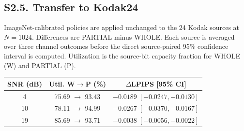 \clearpage\subsection*{S2.5. Transfer to Kodak24}
\label{sec:kodak_transfer}
ImageNet-calibrated policies are applied unchanged to the 24 Kodak sources at $N=1024$. Differences are PARTIAL minus WHOLE. Each source is averaged over three channel outcomes before the direct source-paired 95\% confidence interval is computed. Utilization is the source-bit capacity fraction for WHOLE (W) and PARTIAL (P).
\begin{center}
\small
\begin{tabular}{ccc}
\toprule
SNR (dB) & Util. W$\to$P (\%) & $\Delta$LPIPS [95\% CI] \\
\midrule
4 & 75.69 $\to$ 93.43 & $-0.0189\;[-0.0247,-0.0130]$ \\
10 & 78.11 $\to$ 94.99 & $-0.0267\;[-0.0370,-0.0167]$ \\
19 & 85.69 $\to$ 93.71 & $-0.0038\;[-0.0056,-0.0022]$ \\
\bottomrule
\end{tabular}
\end{center}
